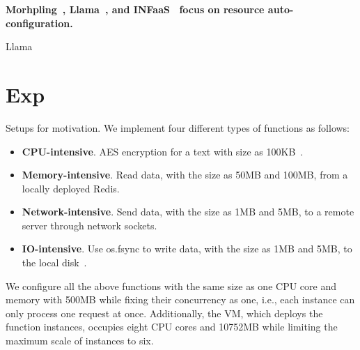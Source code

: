 

\textbf{Morhpling~\cite{socc21-morphling}, Llama~\cite{socc21-llama}, and INFaaS~\cite{socc21-llama} focus on resource auto-configuration.}

Llama



\section{Exp}
Setups for motivation. We implement four different types of functions as follows:
\begin{itemize}
    \item \textbf{CPU-intensive}. AES encryption for a text with size as 100KB~\cite{isca22-lukewarm}.
    \item \textbf{Memory-intensive}. Read data, with the size as 50MB and 100MB, from a locally deployed Redis.
    \item \textbf{Network-intensive}. Send data, with the size as 1MB and 5MB, to a remote server through network sockets.
    \item \textbf{IO-intensive}. Use os.fsync to write data, with the size as 1MB and 5MB, to the local disk~\cite{atc18-peek-bench}.
\end{itemize}

We configure all the above functions with the same size as one CPU core and memory with 500MB while fixing their concurrency as one, i.e., each instance can only process one request at once.
Additionally, the VM, which deploys the function instances, occupies eight CPU cores and 10752MB while limiting the maximum scale of instances to six.